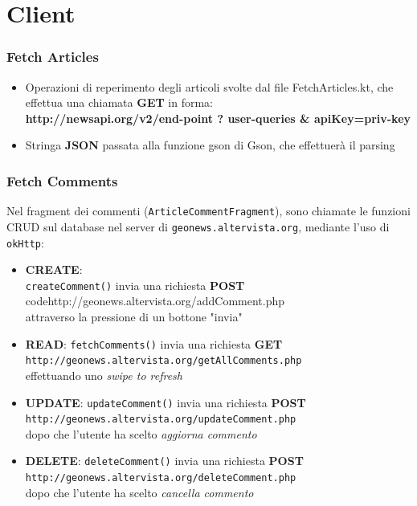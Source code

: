 \documentclass{beamer}
\def\code#1{\texttt{#1}}
\begin{document}
	
	\section{Client}
		\begin{frame}
			\frametitle{Fetch Articles}
			\begin{itemize}
			\item Operazioni di reperimento degli articoli svolte dal file FetchArticles.kt, che effettua una chiamata \textbf{GET} in forma:\\ 
\textbf{http://newsapi.org/v2/\textbf{end-point} ? \textbf{user-queries} \& apiKey=priv-key} 
\item Stringa \textbf{JSON} passata alla funzione gson di Gson, che effettuerà il parsing
			\end{itemize}
			

		\end{frame}
		
			\begin{frame}
			\frametitle{Fetch Comments}
			 Nel fragment dei commenti (\code{ArticleCommentFragment}), sono chiamate le funzioni CRUD sul database nel server di \code{geonews.altervista.org}, mediante l'uso di \code{okHttp}:
\begin{itemize}
\item\textbf{CREATE}: \\ \code{createComment()} invia una richiesta \textbf{POST} \\code{http://geonews.altervista.org/addComment.php} \\attraverso la pressione di un bottone "invia"
\item\textbf{READ}: \code{fetchComments()} invia una richiesta \textbf{GET} \code{http://geonews.altervista.org/getAllComments.php} \\ effettuando uno \textit{swipe to refresh}
\item\textbf{UPDATE}: \code{updateComment()} invia una richiesta \textbf{POST} \code{http://geonews.altervista.org/updateComment.php} \\dopo che l'utente ha scelto \textit{aggiorna commento}
\item\textbf{DELETE}: \code{deleteComment()} invia una richiesta \textbf{POST} \code{http://geonews.altervista.org/deleteComment.php} \\dopo che l'utente ha scelto \textit{cancella commento}
\end{itemize}
\end{frame}

	
\end{document}

